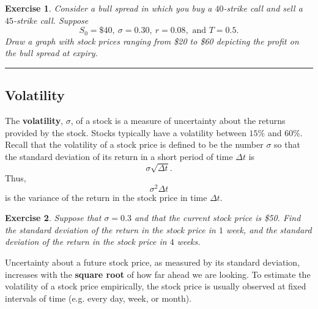 \documentclass[letterpaper,10pt]{article}
\newtheorem{ex}{Exercise}
\begin{document}
\begin{ex}
Consider a bull spread in which you buy a $40$-strike call and sell a $45$-strike call. Suppose $$S_0 = \$40, ~\sigma = 0.30, ~r = 0.08, \text{ and } T = 0.5.$$  Draw a graph with stock prices ranging from \$20 to \$60 depicting the profit on the bull spread at expiry.
\end{ex}

\bigskip

\hrule

\bigskip

\subsection{Volatility}

\noindent The {\bf volatility}, $\sigma$, of a stock is a measure of uncertainty about the returns provided by the stock.  Stocks typically have a volatility between $15\%$ and $60\%$.  Recall that the volatility of a stock price is defined to be the number $\sigma$ so that the standard deviation of its return in a short period of time $\Delta t$ is $$\sigma\sqrt{\Delta t}.$$   Thus, $$\sigma^2\Delta t$$ is the variance of the return in the stock price in time $\Delta t$.  

\begin{ex}
Suppose that $\sigma=0.3$ and that the current stock price is \$50.  Find the standard deviation of the return in the stock price in $1$ week, and the standard deviation of the return in the stock price in $4$ weeks.
\end{ex}

\noindent Uncertainty about a future stock price, as measured by its standard deviation, increases with the {\bf square root} of how far ahead we are looking.  To estimate the volatility of a stock price empirically, the stock price is usually observed at fixed intervals of time (e.g. every day, week, or month).  
\end{document}
